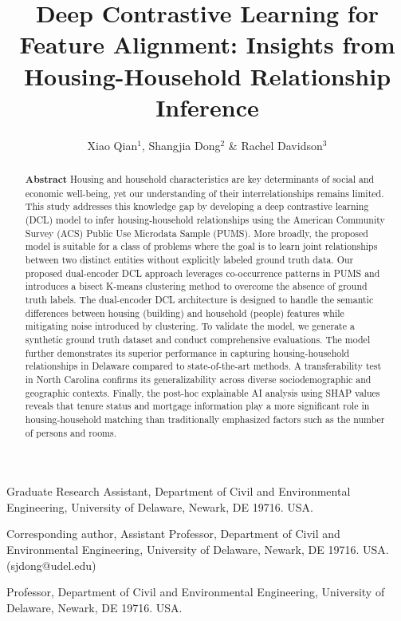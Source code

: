 \documentclass[]{nature_mod}
\title{Deep Contrastive Learning for Feature Alignment: Insights from Housing-Household Relationship Inference}
\author{Xiao Qian$^{1}$, Shangjia Dong$^{2}$ \& Rachel Davidson$^{3}$}
\begin{document}
\maketitle

\begin{affiliations}
 \item Graduate Research Assistant, Department of Civil and Environmental Engineering, University of Delaware, Newark, DE 19716. USA.
 \item Corresponding author, Assistant Professor, Department of Civil and Environmental Engineering, University of Delaware, Newark, DE 19716. USA. (sjdong@udel.edu)
 \item Professor, Department of Civil and Environmental Engineering, University of Delaware, Newark, DE 19716. USA.
\end{affiliations}

\begin{abstract}
\textbf{Abstract} Housing and household characteristics are key determinants of social and economic well-being, yet our understanding of their interrelationships remains limited. This study addresses this knowledge gap by developing a deep contrastive learning (DCL) model to infer housing-household relationships using the American Community Survey (ACS) Public Use Microdata Sample (PUMS). More broadly, the proposed model is suitable for a class of problems where the goal is to learn joint relationships between two distinct entities without explicitly labeled ground truth data. Our proposed dual-encoder DCL approach leverages co-occurrence patterns in PUMS and introduces a bisect K-means clustering method to overcome the absence of ground truth labels. The dual-encoder DCL architecture is designed to handle the semantic differences between housing (building) and household (people) features while mitigating noise introduced by clustering. To validate the model, we generate a synthetic ground truth dataset and conduct comprehensive evaluations. The model further demonstrates its superior performance in capturing housing-household relationships in Delaware compared to state-of-the-art methods. A transferability test in North Carolina confirms its generalizability across diverse sociodemographic and geographic contexts. Finally, the post-hoc explainable AI analysis using SHAP values reveals that tenure status and mortgage information play a more significant role in housing-household matching than traditionally emphasized factors such as the number of persons and rooms.
\end{abstract}
\end{document}
